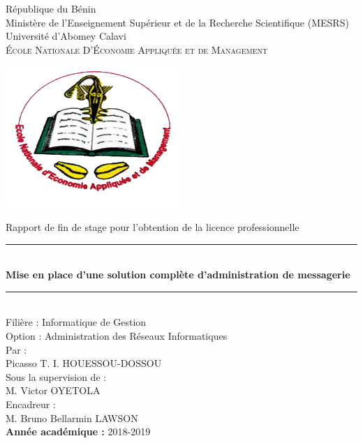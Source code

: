 \documentclass[a4paper,12pt,french]{report} %
\begin{document}
\pagestyle{front}
\begin{titlepage}
	\newcommand{\HRule}{\rule{\linewidth}{0.5mm}}
	

	\center
	{ \huge \LARGE République du Bénin \\[0.5cm]} 
	{\huge \LARGE Ministère de l'Enseignement Supérieur et de la Recherche Scientifique (MESRS)\\[0.5cm]}
	{ \huge \LARGE Université d'Abomey Calavi \\[0.5cm] }
	\textsc{\LARGE
	\'Ecole Nationale D'\'Economie Appliquée et   de Management
	} \\[1cm]
	\begin{center}
		\includegraphics[scale=0.5]{figure/eneam-logo.png} \\[0.5cm]	
	\end{center}
	Rapport de fin de stage pour l'obtention de la licence professionnelle
	
	\HRule \\[0.4cm]
	{ \huge \bfseries Mise en place d'une solution complète d'administration de messagerie \\[0.15cm] }
	\HRule \\[1.2cm]
	Filière : Informatique de Gestion \\[0.4cm]
	Option : Administration des Réseaux Informatiques \\[0.8cm]
	Par : \\[0.1cm]
	Picasso T. I. HOUESSOU-DOSSOU \\[1cm]
	Sous la supervision de :\\[0.1cm]
	 M. Victor OYETOLA \\ [1.3cm]
	 Encadreur : \\[0.1cm] 
	 M. Bruno Bellarmin LAWSON \\[1.4cm]
	\textbf{Année académique :} 2018-2019 
\end{titlepage}
\end{document}
